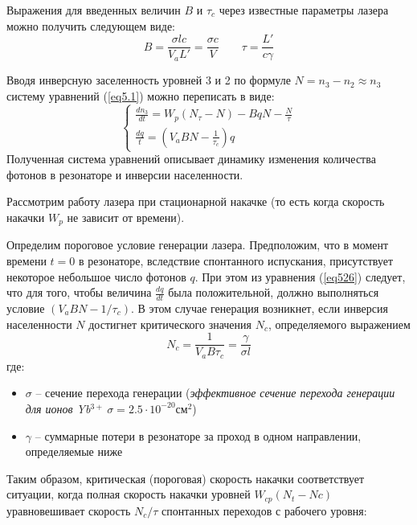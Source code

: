\documentclass[a4paper, 12pt]{article}
\begin{document}
	\par
	Выражения для введенных величин $B$ и $\tau_c$ через известные параметры лазера можно получить следующем виде:
	\begin{equation*}
		B=\frac{\sigma l c}{V_aL'}=\frac{\sigma c}{V}\qquad\tau=\frac{L'}{c\gamma}
	\end{equation*}
	\par
	Вводя инверсную заселенность уровней 3 и 2 по формуле $N=n_3-n_2\approx n_3$ систему уравнений (\ref{eq5.1}) можно переписать в виде:
	\begin{equation}
		\begin{cases}
			\frac{dn_3}{dt}=W_p\left(N_\tau-N\right)-BqN-\frac{N}{\tau}\\
			\frac{dq}{t}=\left(V_aBN-\frac{1}{\tau_c}\right)q
		\end{cases}
		\label{eq526}
	\end{equation}
	Полученная система уравнений описывает динамику изменения количества фотонов в резонаторе и инверсии населенности.\par
	Рассмотрим работу лазера при стационарной накачке (то есть когда скорость накачки $W_p$ не зависит от времени).\par
	Определим пороговое условие генерации лазера.  Предположим, что в момент времени $t=0$ в резонаторе, вследствие спонтанного испускания, присутствует некоторое небольшое число фотонов $q$. При этом из уравнения (\ref{eq526}) следует, что для того, чтобы величина $\frac{dq}{dt}$ была положительной, должно выполняться условие $\left(V_aBN-1/\tau_c\right)$. В этом случае генерация возникнет, если инверсия населенности $N$ достигнет критического значения $N_c$, определяемого выражением
	\begin{equation}
		N_c=\frac{1}{V_aB\tau_c}=\frac{\gamma}{\sigma l}
	\end{equation}
	где:
	\begin{itemize}[noitemsep]
		\item $\sigma$ -- сечение перехода генерации (\textit{эффективное сечение перехода генерации для ионов Yb$^{3+}\ \sigma=2.5\cdot10^{-20}\text{см}^2$})
		\item $\gamma$ -- суммарные потери в резонаторе за проход в одном направлении, определяемые ниже
	\end{itemize}
	\par
	Таким образом, критическая (пороговая) скорость накачки соответствует ситуации, когда полная скорость накачки уровней $W_{cp}\left(N_t-Nc\right)$ уравновешивает скорость $N_c/\tau$ спонтанных переходов с рабочего уровня:
\end{document}
